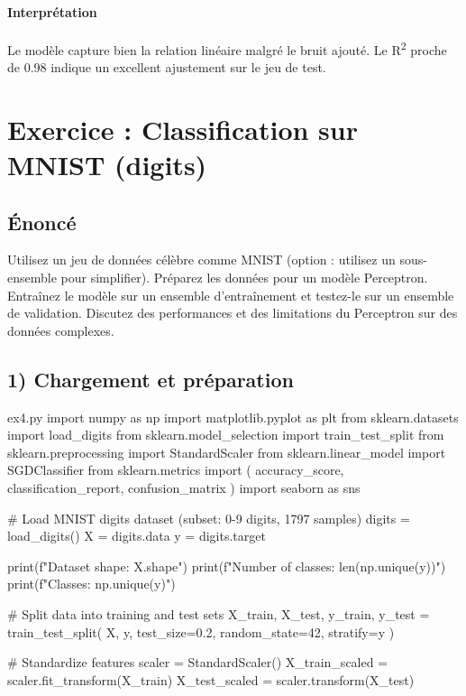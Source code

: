 \documentclass[12pt,a4paper]{article}
\newcommand{\exercice}[1]{
    \clearpage
    \section{Exercice : #1}
}
\begin{document}
\paragraph{Interprétation}
Le modèle capture bien la relation linéaire malgré le bruit ajouté.
Le R\textsuperscript{2} proche de 0.98 indique un excellent ajustement sur
le jeu de test.


\exercice{Classification sur MNIST (digits)}

\subsection*{Énoncé}
Utilisez un jeu de données célèbre comme MNIST (option : utilisez un
sous-ensemble pour simplifier). Préparez les données pour un modèle Perceptron.
Entraînez le modèle sur un ensemble d'entraînement et testez-le sur un
ensemble de validation. Discutez des performances et des limitations du
Perceptron sur des données complexes.

\subsection*{1) Chargement et préparation}

\begin{codeholder}{ex4.py}
import numpy as np
import matplotlib.pyplot as plt
from sklearn.datasets import load_digits
from sklearn.model_selection import train_test_split
from sklearn.preprocessing import StandardScaler
from sklearn.linear_model import SGDClassifier
from sklearn.metrics import (
    accuracy_score, classification_report, confusion_matrix
)
import seaborn as sns

# Load MNIST digits dataset (subset: 0-9 digits, 1797 samples)
digits = load_digits()
X      = digits.data
y      = digits.target

print(f"Dataset shape:     {X.shape}")
print(f"Number of classes: {len(np.unique(y))}")
print(f"Classes:           {np.unique(y)}")

# Split data into training and test sets
X_train, X_test, y_train, y_test = train_test_split(
    X, y, test_size=0.2, random_state=42, stratify=y
)

# Standardize features
scaler         = StandardScaler()
X_train_scaled = scaler.fit_transform(X_train)
X_test_scaled  = scaler.transform(X_test)
\end{codeholder}

\end{document}
